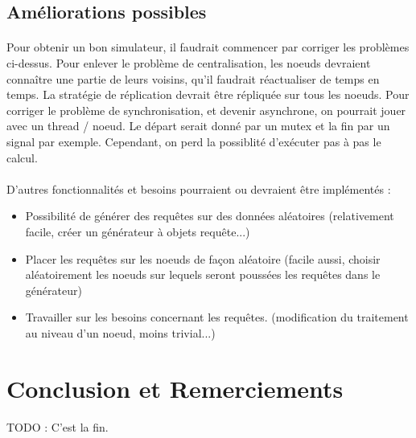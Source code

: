 \documentclass[12pt]{article}
\begin{document}
\subsection{Améliorations possibles}

\paragraph{}Pour obtenir un bon simulateur, il faudrait commencer par corriger les problèmes ci-dessus. Pour enlever le problème de centralisation, les noeuds devraient connaître une partie de leurs voisins, qu'il faudrait réactualiser de temps en temps. La stratégie de réplication devrait être répliquée sur tous les noeuds. Pour corriger le problème de synchronisation, et devenir asynchrone, on pourrait jouer avec un thread / noeud. Le départ serait donné par un mutex et la fin par un signal par exemple. Cependant, on perd la possiblité d'exécuter pas à pas le calcul.

\paragraph{}D'autres fonctionnalités et besoins pourraient ou devraient être implémentés : 

\begin{itemize}
    \item Possibilité de générer des requêtes sur des données aléatoires (relativement facile, créer un générateur à objets requête...)
    \item Placer les requêtes sur les noeuds de façon aléatoire (facile aussi, choisir aléatoirement les noeuds sur lequels seront poussées les requêtes dans le générateur)
    \item Travailler sur les besoins concernant les requêtes. (modification du traitement au niveau d'un noeud, moins trivial...)
\end{itemize}

\paragraph{}

\section{Conclusion et Remerciements}

TODO : C'est la fin.




\end{document}
